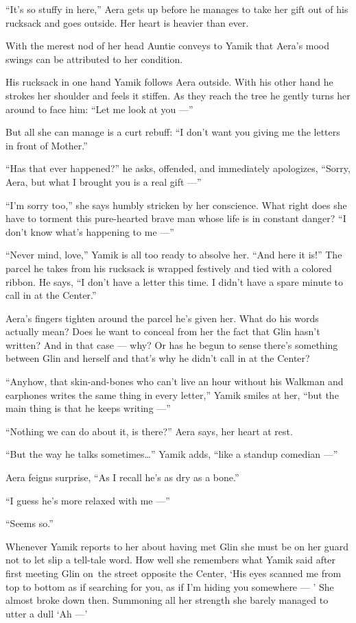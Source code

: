 \documentclass[twoside,11pt]{book}
\begin{document}
``It's so stuffy in here,'' Aera gets up before he manages to take her gift out of his
rucksack and goes outside. Her heart is heavier than ever.

With the merest nod of her head Auntie conveys to Yamik that Aera's
mood swings can be attributed to her condition.

His rucksack in one hand Yamik follows Aera outside. With his other hand he strokes her shoulder and feels it stiffen.
As they reach the tree he gently turns her around to face him: ``Let me look at you ---''

But all she can manage is a curt rebuff:   ``I don't want you giving me the letters in front of
Mother.''

``Has that ever happened?'' he asks, offended, and immediately apologizes,
``Sorry, Aera, but what I brought you is a real gift ---''

``I'm sorry too,'' she says humbly stricken by her conscience. What right does she have to
torment this pure-hearted brave man whose life is in constant danger? ``I don't know what's happening to
me ---''

``Never mind, love,'' Yamik is all too ready to absolve her. ``And here it
is!'' The parcel he takes from his rucksack is wrapped festively and tied with a colored ribbon. He says,
``I don't have a letter this time. I didn't have a spare minute to call in at the Center.''

Aera's fingers tighten around the parcel he's given her. What do his words actually mean? Does he want to conceal from
her the fact that Glin hasn't written? And in that case --- why? Or has he begun to sense there's something between Glin
and herself and that's why he didn't call in at the Center?

``Anyhow, that skin-and-bones who can't live an hour without his Walkman and earphones writes the same
thing in every letter,'' Yamik smiles at her, ``but the main thing is that he
 keeps  writing ---''

``Nothing we can do about it, is there?'' Aera says, her heart at rest.

``But the way he talks sometimes{\ldots}'' Yamik adds, ``like a standup comedian
---''

Aera feigns surprise, ``As I recall he's as dry as a bone.''

``I guess he's more relaxed with me ---''

``Seems so.''

 Whenever Yamik reports to her about having met Glin she must be on her guard not to let slip a tell-tale word. How well
she remembers what Yamik said after first meeting Glin on~the street opposite the Center, `His eyes scanned me from top
to bottom as if searching for you, as if I'm hiding you somewhere --- ' She almost broke down then. Summoning all her
strength she barely managed to utter a dull `Ah ---'
\end{document}
